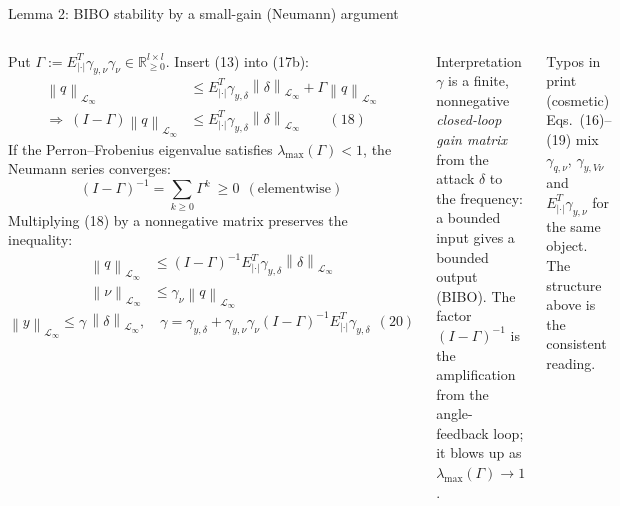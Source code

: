 \documentclass[aspectratio=169,9pt]{beamer}
\newcommand{\norm}[1]{\left\|#1\right\|}
\newcommand{\Linf}{\mathcal{L}_\infty}
\begin{document}
\begin{frame}[t]{Lemma 2: BIBO stability by a small-gain (Neumann) argument}
\footnotesize
\begin{columns}[T]
Put $\Gamma:=E^T_{|\cdot|}\gamma_{y,\nu}\gamma_\nu\in\mathbb R^{l\times l}_{\ge0}$. Insert (13) into (17b):
\begin{align*}
\norm{q}_{\Linf}&\le E^T_{|\cdot|}\gamma_{y,\delta}\norm{\delta}_{\Linf}+\Gamma\norm{q}_{\Linf}\\
\Rightarrow\ (I-\Gamma)\norm{q}_{\Linf}&\le E^T_{|\cdot|}\gamma_{y,\delta}\norm{\delta}_{\Linf}\qquad(18)
\end{align*}
If the Perron--Frobenius eigenvalue satisfies $\lambda_{\max}(\Gamma)<1$, the Neumann series converges:
\[(I-\Gamma)^{-1}=\sum_{k\ge0}\Gamma^k\ \ge0\ \ (\text{elementwise})\]
Multiplying (18) by a nonnegative matrix preserves the inequality:
\begin{align*}
\norm{q}_{\Linf}&\le(I-\Gamma)^{-1}E^T_{|\cdot|}\gamma_{y,\delta}\norm{\delta}_{\Linf}\\
\norm{\nu}_{\Linf}&\le\gamma_\nu\norm{q}_{\Linf}
\end{align*}
\[\boxed{\norm{y}_{\Linf}\le\gamma\,\norm{\delta}_{\Linf}},\quad\gamma=\gamma_{y,\delta}+\gamma_{y,\nu}\gamma_\nu(I-\Gamma)^{-1}E^T_{|\cdot|}\gamma_{y,\delta}\ \ (20)\]
\begin{block}{Interpretation}
$\gamma$ is a finite, nonnegative \emph{closed-loop gain matrix} from the attack $\delta$ to the frequency: a bounded input gives a bounded output (BIBO). The factor $(I-\Gamma)^{-1}$ is the amplification from the angle-feedback loop; it blows up as $\lambda_{\max}(\Gamma)\to1$.
\end{block}
\begin{alertblock}{Typos in print (cosmetic)}
Eqs.~(16)--(19) mix $\gamma_{q,\nu}$, $\gamma_{y,V\nu}$ and $E^T_{|\cdot|}\gamma_{y,\nu}$ for the same object. The structure above is the consistent reading.
\end{alertblock}
\end{columns}
\end{frame}
\end{document}
